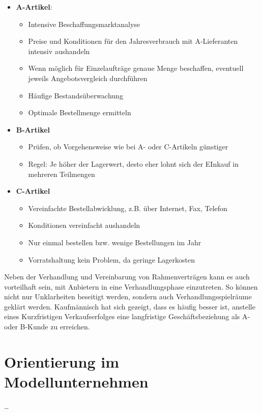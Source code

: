 \documentclass[a4paper, 12pt]{report}
\begin{document}
\begin{itemize}
    \item \textbf{A-Artikel}: 
    \begin{itemize}
        \item Intensive Beschaffungsmarktanalyse
        \item Preise und Konditionen für den Jahresverbrauch mit A-Lieferanten 
            intensiv aushandeln
        \item Wenn möglich für Einzelaufträge genaue Menge beschaffen, eventuell 
            jeweils Angebotsvergleich durchführen 
        \item Häufige Bestandsüberwachung
        \item Optimale Bestellmenge ermitteln
    \end{itemize}
    \item \textbf{B-Artikel}
    \begin{itemize}
        \item Prüfen, ob Vorgehensweise wie bei A- oder C-Artikeln günstiger
        \item Regel: Je höher der Lagerwert, desto eher lohnt sich der EInkauf 
            in mehreren Teilmengen
    \end{itemize}
    \item \textbf{C-Artikel}
    \begin{itemize}
        \item Vereinfachte Bestellabwicklung, z.B. über Internet, Fax, Telefon
        \item Konditionen vereinfacht aushandeln
        \item Nur einmal bestellen bzw. wenige Bestellungen im Jahr
        \item Vorratshaltung kein Problem, da geringe Lagerkosten
    \end{itemize}
\end{itemize}

Neben der Verhandlung und Vereinbarung von Rahmenverträgen kann es auch 
vorteilhaft sein, mit Anbietern in eine Verhandlungsphase einzutreten. So können
nicht nur Unklarheiten beseitigt werden, sondern auch Verhandlungsspielräume 
geklärt werden. Kaufmännisch hat sich gezeigt, dass es häufig besser ist, 
anstelle  eines Kurzfristigen Verkaufserfolges eine langfristige
Geschäftsbeziehung als A- oder B-Kunde zu erreichen.  

\section{Orientierung im Modellunternehmen}
\dots
\end{document}
